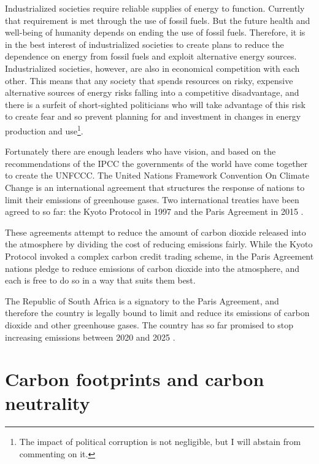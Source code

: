 Industrialized societies require reliable supplies of energy to function.
Currently that requirement is met through the use of fossil fuels. But the
future health and well-being of humanity depends on ending the use of fossil
fuels. Therefore, it is in the best interest of industrialized societies to
create plans to reduce the dependence on energy from fossil fuels and exploit
alternative energy sources. Industrialized societies, however, are also in
economical competition with each other. This means that any society that spends
resources on risky, expensive alternative sources of energy risks falling into a
competitive disadvantage, and there is a surfeit of short-sighted politicians
who will take advantage of this risk to create fear and so prevent planning for
and investment in changes in energy production and use\footnote{The impact of
political corruption is not negligible, but I will abstain from commenting on
it.}.

Fortunately there are enough leaders who have vision, and based on the
recommendations of the IPCC the governments of the world have come together to
create the UNFCCC. The United Nations Framework Convention On Climate Change is
an international agreement that structures the response of nations to limit
their emissions of greenhouse gases. Two international treaties have been agreed
to so far: the Kyoto Protocol in 1997 \autocite{Kyoto1997} and the Paris
Agreement in 2015 \autocite{Paris2015}.

These agreements attempt to reduce the amount of carbon dioxide released into
the atmosphere by dividing the cost of reducing emissions fairly. While the
Kyoto Protocol invoked a complex carbon credit trading scheme, in the Paris
Agreement nations pledge to reduce emissions of carbon dioxide into the
atmosphere, and each is free to do so in a way that suits them best.

The Republic of South Africa is a signatory to the Paris Agreement, and
therefore the country is legally bound to limit and reduce its emissions of
carbon dioxide and other greenhouse gases. The country has so far promised to
stop increasing emissions between 2020 and 2025 \autocite{INDC2016}.


\section{Carbon footprints and carbon neutrality}

